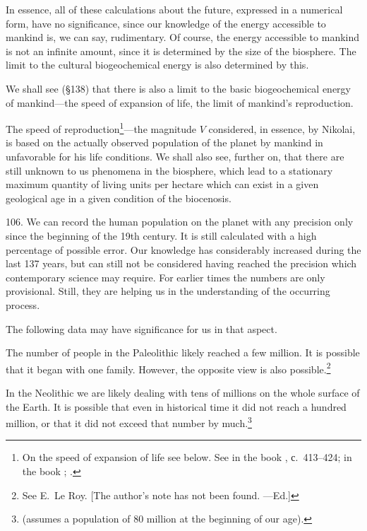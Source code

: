 In essence, all of these calculations about the future, expressed in a
numerical form, have no significance, since our knowledge of the energy
accessible to mankind is, we can say, rudimentary.  Of course, the energy
accessible to mankind is not an infinite amount, since it is determined by the
size of the biosphere.  The limit to the cultural biogeochemical energy is
also determined by this.

We shall see (§138) that there is also a limit to the basic biogeochemical
energy of mankind---the speed of expansion of life, the limit of mankind's
reproduction.

The speed of reproduction\footnote{
	On the speed of expansion of life see below.  See
	\foreignlanguage{french}{\cite{vernadsky1926etudes1}} in the book
	\foreignlanguage{russian}{\cite{vernadsky1994zhivoe-p413-424}, с.~413--424};
	\foreignlanguage{russian}{\cite{vernadsky1940biogeohimicheskie-p118-125}}
	in the book
	\foreignlanguage{russian}{\cite{vernadsky1994zhivoe-p437-444}};
	\foreignlanguage{russian}{\cite{vernadsky1965himicheskoe-ch20}.}
}---the magnitude $V$ considered, in essence, by Nikolai, is based on the
actually observed population of the planet by mankind in unfavorable for his
life conditions.  We shall also see, further on, that there are still unknown
to us phenomena in the biosphere, which lead to a stationary maximum quantity
of living units per hectare which can exist in a given geological age in a
given condition of the biocenosis.


106. We can record the human population on the planet with any precision only
since the beginning of the 19th century.  It is still calculated with a high
percentage of possible error.  Our knowledge has considerably increased during
the last 137 years, but can still not be considered having reached the
precision which contemporary science may require.  For earlier times the
numbers are only provisional.  Still, they are helping us in the understanding
of the occurring process.

The following data may have significance for us in that aspect.

The number of people in the Paleolithic likely reached a few million.  It is
possible that it began with one family.  However, the opposite view is also
possible.\footnote{See E.~Le Roy. [The author's note has not been found.
---Ed.]}

In the Neolithic we are likely dealing with tens of millions on the whole
surface of the Earth.  It is possible that even in historical time it did not
reach a hundred million, or that it did not exceed that number by
much.\footnote{
	\cite{weinberg1922dvuhdesyatitysyachiletiyu-p21} (assumes a
	population of 80 million at the beginning of our age).}

